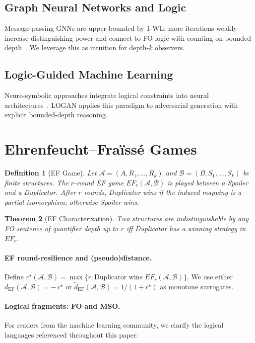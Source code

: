 \documentclass{article}
\newtheorem{theorem}{Theorem}[section]
\newtheorem{definition}[theorem]{Definition}
\begin{document}
\subsection{Graph Neural Networks and Logic}
Message-passing GNNs are upper-bounded by 1-WL; more iterations weakly increase distinguishing power and connect to FO logic with counting on bounded depth~\cite{xu2018powerful,morris2019weisfeiler,immerman1999descriptive,libkin2004elements,grohe2017descriptive}. We leverage this as intuition for depth-$k$ observers.

\subsection{Logic-Guided Machine Learning}
Neuro-symbolic approaches integrate logical constraints into neural architectures~\cite{garcez2019neural}. LOGAN applies this paradigm to adversarial generation with explicit bounded-depth reasoning.

\section{Ehrenfeucht--Fra\"iss\'e Games}

\begin{definition}[EF Game]
Let $\mathcal{A} = (A, R_1, \ldots, R_k)$ and $\mathcal{B} = (B, S_1, \ldots, S_k)$ be finite structures. The $r$-round EF game $EF_r(\mathcal{A}, \mathcal{B})$ is played between a \emph{Spoiler} and a \emph{Duplicator}. After $r$ rounds, Duplicator wins if the induced mapping is a partial isomorphism; otherwise Spoiler wins.
\end{definition}

\begin{theorem}[EF Characterization]
\label{thm:ef_char}
Two structures are indistinguishable by any FO sentence of quantifier depth up to $r$ iff Duplicator has a winning strategy in $EF_r$.
\end{theorem}

\paragraph{EF round-resilience and (pseudo)distance.}
Define $r^\star(\mathcal{A},\mathcal{B})=\max\{r:\text{Duplicator wins }EF_r(\mathcal{A},\mathcal{B})\}$. We use either $d_{\mathrm{EF}}(\mathcal{A},\mathcal{B})=-\,r^\star$ or $\tilde d_{\mathrm{EF}}(\mathcal{A},\mathcal{B})=1/(1+r^\star)$ as monotone surrogates.

\paragraph{Logical fragments: FO and MSO.}
For readers from the machine learning community, we clarify the logical languages referenced throughout this paper:
\end{document}
